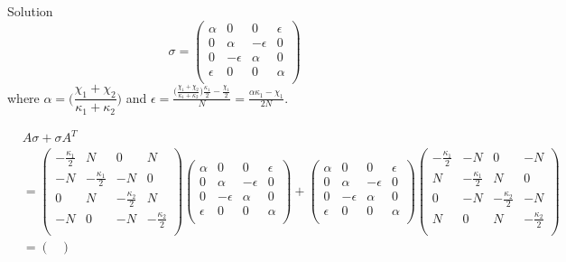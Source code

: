 \documentclass[11pt,a4paper]{article}
\numberwithin{equation}{section}
\begin{document}
	
	\iffalse
	Solution
	\begin{equation*}
	\sigma = \begin{pmatrix}
	\alpha & 0 & 0 & \epsilon\\
	0 & \alpha & -\epsilon & 0\\
	0 & -\epsilon & \alpha & 0 \\
	\epsilon & 0 & 0 & \alpha\\
	\end{pmatrix}
	\end{equation*}	
	where $\alpha = \Big(\dfrac{\chi_1 + \chi_2}{\kappa_1 + \kappa_2}\Big)$ and $\epsilon = \frac{\big(\frac{\chi_1 + \chi_2}{\kappa_1 + \kappa_2}\big) \frac{\kappa_1}{2} - \frac{\chi_1}{2}}{N} = \frac{\alpha \kappa_1 - \chi_1}{2N}$.
	
	\begin{align*}
	&A\sigma +\sigma A^{T}&\\
	&= \begin{pmatrix}
	-\frac{\kappa_1}{2} & N & 0 & N\\
	-N & -\frac{\kappa_1}{2} & -N & 0 \\
	0 & N & -\frac{\kappa_2}{2} & N\\
	-N & 0 & -N & -\frac{\kappa_2}{2}\\
	\end{pmatrix}		\begin{pmatrix}
	\alpha & 0 & 0 & \epsilon\\
	0 & \alpha & -\epsilon & 0\\
	0 & -\epsilon & \alpha & 0 \\
	\epsilon & 0 & 0 & \alpha\\
	\end{pmatrix} + \begin{pmatrix}
	\alpha & 0 & 0 & \epsilon\\
	0 & \alpha & -\epsilon & 0\\
	0 & -\epsilon & \alpha & 0 \\
	\epsilon & 0 & 0 & \alpha\\
	\end{pmatrix}	\begin{pmatrix}
	-\frac{\kappa_1}{2} & -N & 0 & -N\\
	N & -\frac{\kappa_1}{2} & N & 0 \\
	0 & -N & -\frac{\kappa_2}{2} & -N\\
	N & 0 & N & -\frac{\kappa_2}{2}\\
	\end{pmatrix}&\\
	&= \begin{pmatrix}

\end{pmatrix}
\end{align*}
\end{document}
